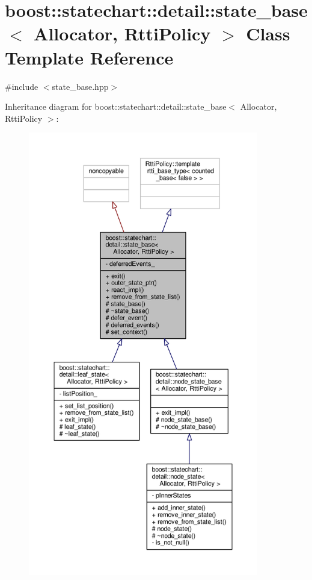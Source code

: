\hypertarget{classboost_1_1statechart_1_1detail_1_1state__base}{}\section{boost\+:\+:statechart\+:\+:detail\+:\+:state\+\_\+base$<$ Allocator, Rtti\+Policy $>$ Class Template Reference}
\label{classboost_1_1statechart_1_1detail_1_1state__base}


{\ttfamily \#include $<$state\+\_\+base.\+hpp$>$}



Inheritance diagram for boost\+:\+:statechart\+:\+:detail\+:\+:state\+\_\+base$<$ Allocator, Rtti\+Policy $>$\+:
\nopagebreak
\begin{figure}[H]
\begin{center}
\leavevmode
\includegraphics[height=550pt]{classboost_1_1statechart_1_1detail_1_1state__base__inherit__graph}
\end{center}
\end{figure}


